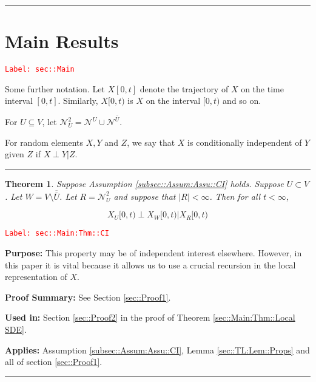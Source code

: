 \documentclass[12pt]{article}
\newcommand{\mc}{\mathcal}
\newcommand{\ov}{\overline}
\newcommand{\tr}{\textcolor{red}}
\newcommand{\labe}[1]{\tr{\texttt{Label: #1}}}
\newcommand{\purpose}{\textbf{Purpose: }}
\newcommand{\pfsum}{\textbf{Proof Summary: }}
\newcommand{\usein}{\textbf{Used in: }}
\newcommand{\app}{\textbf{Applies: }}
\newcommand{\ind}{\hspace{24pt}}
\newcommand{\lin}{\rule{\linewidth}{0.4 pt}}
\renewcommand{\U}{U}							%
\newcommand{\UU}{W}								%
\newcommand{\UUU}{R}							%
\renewcommand{\t}{t}							%
\newcommand{\X}{X}								%
\newcommand{\neigh}{\mc{N}}						%
\newcommand{\dneigh}{\mc{N}^2}					%
\newcommand{\vind}[1]{^{#1}}					%
\newcommand{\cind}[1]{_{#1}}					%
\newcommand{\tip}[1]{#1}						%
\newcommand{\dnvind}[1]{_{#1}}					%
\newcommand{\XX}{Y}								%
\newcommand{\XXX}{Z}							%
\newtheorem{thms}{Theorem}[section]
\begin{document}
\lin
\section{Main Results}
\label{sec::Main}\labe{sec::Main}

Some further notation. Let \(\X\tip{[0,\t]}\) denote the trajectory of \(\X\) on the time interval \([0,\t]\). Similarly, \(\X\tip{[0,\t)}\) is \(\X\) on the interval \([0,\t)\) and so on.

\ind For \(\U \subseteq V\), let \(\dneigh\dnvind{\U} = \neigh\vind{\U} \cup \neigh\vind{\ov{\U}}\). 

\ind For random elements \(\X,\XX\) and \(\XXX\), we say that \(\X\) is conditionally independent of \(\XX\) given \(\XXX\) if \(\X\perp\XX|\XXX\).

\lin

\begin{thms}
Suppose Assumption \ref{subsec::Assum:Assu::CI} holds. Suppose \(\U \subset V\). Let \(\UU =V\setminus \ov{\ov{\U}}\). Let \(\UUU= \dneigh\dnvind{U}\) and suppose that \(|\UUU| < \infty\). Then for all \(\t < \infty\),

\[\X\cind{\U}\tip{[0,\t)}\perp \X\cind{\UU}\tip{[0,\t)}|\X\cind{\UUU}\tip{[0,\t)}\]
\label{sec::Main:Thm::CI}
\end{thms}
\labe{sec::Main:Thm::CI}

\purpose This property may be of independent interest elsewhere. However, in this paper it is vital because it allows us to use a crucial recursion in the local representation of \(\X\).

\pfsum See Section \ref{sec::Proof1}.

\usein Section \ref{sec::Proof2} in the proof of Theorem \ref{sec::Main:Thm::Local SDE}.

\app Assumption \ref{subsec::Assum:Assu::CI}, Lemma \ref{sec::TL:Lem::Props} and all of section \ref{sec::Proof1}.

\lin
\end{document}
